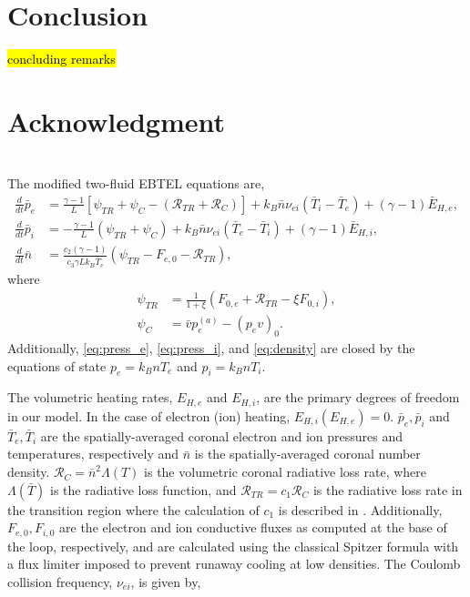 \documentclass[tighten,apj]{emulateapj}
\begin{document}
	\section{Conclusion}
	\label{sec:conclusions}
	\hl{concluding remarks}
	\section*{Acknowledgment}
	\appendix
	\section{}
	\label{appendix}
	The modified two-fluid EBTEL equations are,
		\begin{align}
			\frac{d}{dt}\bar{p}_e &= \frac{\gamma - 1}{L}[\psi_{TR} + \psi_C -(\mathcal{R}_{TR} + \mathcal{R}_C)] + k_B\bar{n}\nu_{ei}(\bar{T}_i-\bar{T}_e) + (\gamma-1)\bar{E}_{H,e},\label{eq:press_e} \\[0.5em]
			\frac{d}{dt}\bar{p}_i &= -\frac{\gamma - 1}{L}(\psi_{TR} + \psi_C) + k_B\bar{n}\nu_{ei}(\bar{T}_e-\bar{T}_i) + (\gamma-1)\bar{E}_{H,i},\label{eq:press_i} \\[0.5em]
			\frac{d}{dt}\bar{n} &= \frac{c_2(\gamma-1)}{c_3\gamma Lk_B\bar{T}_e}(\psi_{TR} - F_{e,0}-\mathcal{R}_{TR}), 	\label{eq:density}
		\end{align}
		where 
		\begin{align}
			\psi_{TR} &= \frac{1}{1 + \xi}(F_{0,e} + \mathcal{R}_{TR} - \xi F_{0,i}), \label{eq:psi_tr}\\[0.5em]
			\psi_C  &= \bar{v}p_e^{(a)} - (p_ev)_0. \label{eq:psi_C}
		\end{align}
		Additionally, \autoref{eq:press_e}, \autoref{eq:press_i}, and \autoref{eq:density} are closed by the equations of state $p_e=k_BnT_e$ and $p_i=k_BnT_i$. 
		\par The volumetric heating rates, $E_{H,e}$ and $E_{H,i}$, are the primary degrees of freedom in our model. In the case of electron (ion) heating, $E_{H,i}(E_{H,e})=0$. $\bar{p}_e,\bar{p}_i$ and $\bar{T}_e,\bar{T}_i$ are the spatially-averaged coronal electron and ion pressures and temperatures, respectively and $\bar{n}$ is the spatially-averaged coronal number density. $\mathcal{R}_C=\bar{n}^2\Lambda(T)$ is the volumetric coronal radiative loss rate, where $\Lambda(\bar{T})$ is the radiative loss function, and $\mathcal{R}_{TR}=c_1\mathcal{R}_C$ is the radiative loss rate in the transition region where the calculation of $c_1$ is described in \citet{cargill_enthalpy-based_2012}. Additionally, $F_{e,0},F_{i,0}$ are the electron and ion conductive fluxes as computed at the base of the loop, respectively, and are calculated using the classical Spitzer formula with a flux limiter imposed to prevent runaway cooling at low densities. The Coulomb collision frequency, $\nu_{ei}$, is given by,
\end{document}
